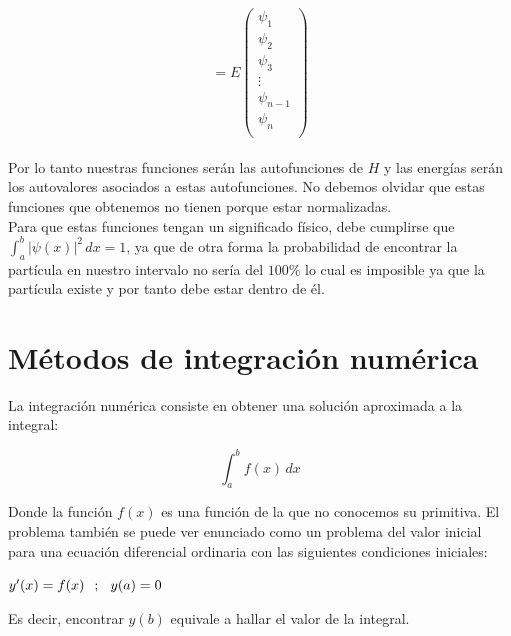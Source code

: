 \documentclass{article}
\begin{document}
\begin{equation}
	=
	E
	\left(
	\begin{matrix}
		\psi_1 \\
		\psi_2 \\
		\psi_3 \\
		\vdots\\
		\psi_{n-1} \\
		\psi_{n} \\
	\end{matrix}
	\right)
\end{equation} \\
	
Por lo tanto nuestras funciones serán las autofunciones de $H$ y las energías serán los autovalores asociados a estas autofunciones. No debemos olvidar que estas funciones que obtenemos no tienen porque estar normalizadas.\\

Para que estas funciones tengan un significado físico, debe cumplirse que $\int_{a}^{b}  |\psi(x)|^2\,dx =1$, ya que de otra forma la probabilidad de encontrar la partícula en nuestro intervalo no sería del $100\%$ lo cual es imposible ya que la partícula existe y por tanto debe estar dentro de él.
\newpage

\section{Métodos de integración numérica}

La integración numérica consiste en obtener una solución aproximada a la integral:

\begin{equation}
	\int_{a}^{b} f(x) \,dx 
\end{equation}

Donde la función $f(x)$ es una función de la que no conocemos su primitiva.
El problema también se puede ver enunciado como un problema del valor inicial 
para una ecuación diferencial ordinaria con las siguientes condiciones iniciales:

\begin{center}
	$y'(x)=f(x) \hspace{2.5mm} ; \hspace{2.5mm} y(a)=0$\\
\end{center}

Es decir, encontrar $y(b)$ equivale a hallar el valor de la integral. \\
\end{document}
